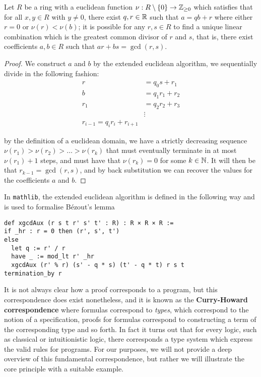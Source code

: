 \begin{example}
    Let $R$ be a ring with a euclidean function $\nu : R \setminus \{0\} \rightarrow \mathbb{Z}_{\geq 0}$ which satisfies that for all $x, y \in R$ with $y \ne 0$, there exist $q, r \in \mathbb{R}$ such that $a  = qb + r$ where either $r = 0$ or $\nu(r) < \nu(b)$;
it is possible for any $r,s \in R$ to find a unique linear combination which is the greatest common divisor of $r$ and $s$, that is, there exist coefficients $a, b \in R$ such that $ar + bs = \gcd(r, s)$.
\end{example}
\begin{proof}
    We construct $a$ and $b$ by the extended euclidean algorithm, we sequentially divide in the following fashion:
      \begin{align}
          r &= q_0 s + r_1\\
          b &= q_1 r_1 + r_2\\
          r_1 &= q_2 r_2 + r_3\\
          &\vdots\\
          r_{i-1} = q_i r_i + r_{i + 1}&
      \end{align}
  
      by the definition of a euclidean domain, we have a strictly decreasing sequence $\nu(r_1) > \nu(r_2) > \ldots > \nu(r_k)$ that must eventually terminate in at most $\nu(r_1) + 1$ steps,
      and must have that $\nu(r_k) = 0$ for some $k \in \mathbb{N}$. It will then be that $r_{k -1} = \gcd(r, s)$, and by back substitution we can recover the values for the coefficients $a$ and $b$.
  \end{proof}

In \texttt{mathlib}, the extended euclidean algorithm is defined in the following way and is used to formalise Bézout's lemma

\begin{verbatim}
def xgcdAux (r s t r' s' t' : R) : R × R × R :=
if _hr : r = 0 then (r', s', t')
else
  let q := r' / r
  have _ := mod_lt r' _hr
  xgcdAux (r' % r) (s' - q * s) (t' - q * t) r s t
termination_by r
\end{verbatim}

It is not always clear how a proof corresponds to a program, but this correspondence does exist nonetheless, and it is known as the \textbf{Curry-Howard correspondence} where formulas correspond to \textit{types}, which correspond to the notion of a specification, 
proofs for formulas correspond to constructing a term of the corresponding type and so forth. In fact it turns out that for every logic, such as classical or intuitionistic logic, there corresponds a type system which express the valid rules for programs. 
For our purposes, we will not provide a deep overview of this fundamental correspondence, but rather we will illustrate the core principle with a suitable example.


